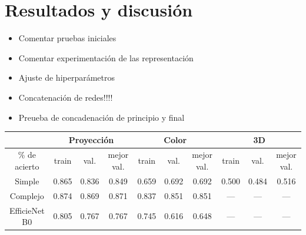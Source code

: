 \documentclass[a4paper,12pt,twoside,titlepage]{article}
\begin{document}
\section{Resultados y discusión}
\begin{itemize}
  \item Comentar pruebas iniciales
  \item Comentar experimentación de las representación
  \item Ajuste de hiperparámetros
  \item Concatenación de redes!!!!
  \item Preueba de concadenación de principio y final
\end{itemize}

\begin{table}[h!]

  \centering
  \begin{tabular}{cccccccccc}
  \hline
  \multicolumn{1}{|c|}{}                       & \multicolumn{3}{c|}{Proyección}                                                           & \multicolumn{3}{c|}{Color}                                                                & \multicolumn{3}{c|}{3D}                                                                   \\ \hline
  \multicolumn{1}{|c|}{\% de acierto} & \multicolumn{1}{c|}{train} & \multicolumn{1}{c|}{val.}  & \multicolumn{1}{c|}{mejor val.} & \multicolumn{1}{c|}{train} & \multicolumn{1}{c|}{val.}  & \multicolumn{1}{c|}{mejor val.} & \multicolumn{1}{c|}{train} & \multicolumn{1}{c|}{val.}  & \multicolumn{1}{c|}{mejor val.} \\ \hline
  \multicolumn{1}{|c|}{Simple}                 & \multicolumn{1}{c|}{0.865} & \multicolumn{1}{c|}{0.836} & \multicolumn{1}{c|}{0.849}      & \multicolumn{1}{c|}{0.659} & \multicolumn{1}{c|}{0.692} & \multicolumn{1}{c|}{0.692}      & \multicolumn{1}{c|}{0.500} & \multicolumn{1}{c|}{0.484} & \multicolumn{1}{c|}{0.516}      \\ \hline
  \multicolumn{1}{|c|}{Complejo}               & \multicolumn{1}{c|}{0.874} & \multicolumn{1}{c|}{0.869} & \multicolumn{1}{c|}{0.871}      & \multicolumn{1}{c|}{0.837} & \multicolumn{1}{c|}{0.851} & \multicolumn{1}{c|}{0.851}      & \multicolumn{1}{c|}{---}   & \multicolumn{1}{c|}{---}   & \multicolumn{1}{c|}{---}        \\ \hline
  \multicolumn{1}{|c|}{EfficieNet B0}          & \multicolumn{1}{c|}{0.805} & \multicolumn{1}{c|}{0.767} & \multicolumn{1}{c|}{0.767}      & \multicolumn{1}{c|}{0.745} & \multicolumn{1}{c|}{0.616} & \multicolumn{1}{c|}{0.648}      & \multicolumn{1}{c|}{---}   & \multicolumn{1}{c|}{---}   & \multicolumn{1}{c|}{---}        \\ \hline

\end{tabular}
\end{table}
\end{document}
